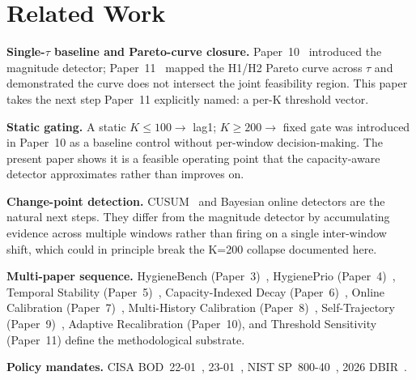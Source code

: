 \section{Related Work}

\textbf{Single-$\tau$ baseline and Pareto-curve closure.}
Paper~10~\cite{paper10adaptive} introduced the magnitude detector;
Paper~11~\cite{paper11tau} mapped the H1/H2 Pareto curve across
$\tau$ and demonstrated the curve does not intersect the joint
feasibility region. This paper takes the next step Paper~11
explicitly named: a per-K threshold vector.

\textbf{Static gating.} A static $K \leq 100 \to$ lag1; $K \geq 200
\to$ fixed gate was introduced in Paper~10 as a baseline control
without per-window decision-making. The present paper shows it is a
feasible operating point that the capacity-aware detector approximates
rather than improves on.

\textbf{Change-point detection.} CUSUM~\cite{page1954cusum} and
Bayesian online detectors are the natural next steps. They differ
from the magnitude detector by accumulating evidence across multiple
windows rather than firing on a single inter-window shift, which
could in principle break the K=200 collapse documented here.

\textbf{Multi-paper sequence.} HygieneBench (Paper~3)~\cite{paper3hygienebench},
HygienePrio (Paper~4)~\cite{paper4hygieneprio}, Temporal Stability
(Paper~5)~\cite{paper5temporal}, Capacity-Indexed Decay
(Paper~6)~\cite{paper6capacity}, Online Calibration (Paper~7)~\cite{paper7online},
Multi-History Calibration (Paper~8)~\cite{paper8multi},
Self-Trajectory (Paper~9)~\cite{paper9selftraj}, Adaptive
Recalibration (Paper~10), and Threshold Sensitivity (Paper~11)
define the methodological substrate.

\textbf{Policy mandates.} CISA BOD~22-01~\cite{cisa2021bod2201},
23-01~\cite{cisa2022bod2301}, NIST SP~800-40~\cite{nist2022sp80040r4},
2026 DBIR~\cite{verizon2026dbir}.

